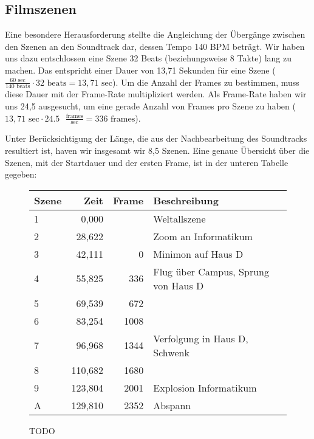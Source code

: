 \subsection{Filmszenen}

Eine besondere Herausforderung stellte die Angleichung der Übergänge zwischen den Szenen an den Soundtrack dar, dessen Tempo 140 BPM beträgt. Wir haben uns dazu entschlossen eine Szene 32 Beats (beziehungsweise 8 Takte) lang zu machen. Das entspricht einer Dauer von 13,71 Sekunden für eine Szene ($\frac{60 \text{ sec}}{140 \text{ beats}} \cdot 32 \text{ beats} = 13,71 \text{ sec}$). Um die Anzahl der Frames zu bestimmen, muss diese Dauer mit der Frame-Rate multipliziert werden. Als Frame-Rate haben wir uns 24,5 ausgesucht, um eine gerade Anzahl von Frames pro Szene zu haben ($13,71 \text{ sec} \cdot 24.5\text{ } \frac{\text{frames}}{\text{sec}} = 336 \text{ frames}$).

Unter Berücksichtigung der Länge, die aus der Nachbearbeitung des Soundtracks resultiert ist, haven wir insgesamt wir 8,5 Szenen. Eine genaue Übersicht über die Szenen, mit der Startdauer und der ersten Frame, ist in der unteren Tabelle gegeben:

\begin{figure}
	\begin{tabular}{p{1cm}rrp{9cm}}
		\textbf{Szene} & \textbf{Zeit} & \textbf{Frame} & \textbf{Beschreibung} \\
		\hline
		1 & 0,000 & & Weltallszene\\
		2 & 28,622 & & Zoom an Informatikum\\
		3 & 42,111 & 0 & Minimon auf Haus D\\
		4 & 55,825 & 336 & Flug über Campus, Sprung von Haus D\\
		5 & 69,539 & 672 & \\
		6 & 83,254 & 1008 & \\
		7 & 96,968 & 1344 & Verfolgung in Haus D, Schwenk\\
		8 & 110,682 & 1680 & \\
		9 & 123,804 & 2001 & Explosion Informatikum\\
		A & 129,810 & 2352 & Abspann\\
	\end{tabular}
	\caption{TODO}
	\label{fig:scenes}
\end{figure}
